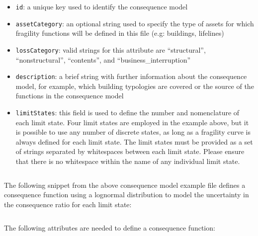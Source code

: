 \begin{itemize}

    \item \Verb+id+: a unique key used to identify the \gls{consequence model}

    \item \Verb+assetCategory+: an optional string used to specify the type of
    \glspl{asset} for which fragility functions will be defined in this file 
    (e.g: buildings, lifelines)

    \item \Verb+lossCategory+: valid strings for this attribute are 
    ``structural'', ``nonstructural'', ``contents'', and 
    ``business\_interruption''

    \item \Verb+description+: a brief string with further information about the
    \gls{consequence model}, for example, which building typologies are covered or 
    the source of the functions in the \gls{consequence model}

    \item \Verb+limitStates+: this field is used to define the number and 
    nomenclature of each limit state. Four limit states are employed in the 
    example above, but it is possible to use any number of discrete states,
    as long as a fragility curve is always defined for each limit state. The 
    limit states must be provided as a set of strings separated by whitespaces 
    between each limit state. Please ensure that there is no whitespace within 
    the name of any individual limit state.

\end{itemize}

\inputminted[firstline=4,firstnumber=4,lastline=9,fontsize=\footnotesize,frame=single,linenos,bgcolor=lightgray]{xml}{oqum/risk/Verbatim/input_consequence.xml}

The following snippet from the above consequence model example file defines a
consequence function using a lognormal distribution to model the uncertainty
in the consequence ratio for each limit state:

\inputminted[firstline=11,firstnumber=11,lastline=16,fontsize=\footnotesize,frame=single,linenos,bgcolor=lightgray]{xml}{oqum/risk/Verbatim/input_consequence.xml}

The following attributes are needed to define a consequence function:

